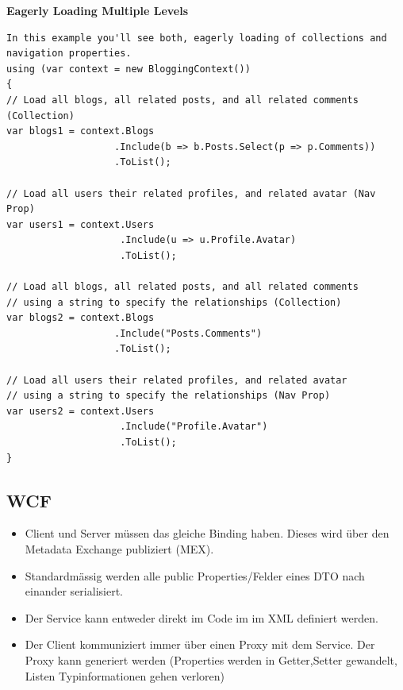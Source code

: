 \documentclass[
a4paper,
oneside,
10pt,
fleqn,
headsepline,
toc=listofnumbered, 
bibliography=totocnumbered]{scrartcl}
\begin{document}
\textbf{Eagerly Loading Multiple Levels}
\begin{lstlisting}
In this example you'll see both, eagerly loading of collections and navigation properties.
using (var context = new BloggingContext()) 
{ 
// Load all blogs, all related posts, and all related comments (Collection)
var blogs1 = context.Blogs 
                   .Include(b => b.Posts.Select(p => p.Comments)) 
                   .ToList(); 

// Load all users their related profiles, and related avatar (Nav Prop)
var users1 = context.Users 
                    .Include(u => u.Profile.Avatar) 
                    .ToList(); 

// Load all blogs, all related posts, and all related comments  
// using a string to specify the relationships (Collection)
var blogs2 = context.Blogs 
                   .Include("Posts.Comments") 
                   .ToList(); 

// Load all users their related profiles, and related avatar  
// using a string to specify the relationships (Nav Prop)
var users2 = context.Users 
                    .Include("Profile.Avatar") 
                    .ToList(); 
}
\end{lstlisting}

\clearpage

\subsection{WCF}
\begin{itemize}
	\item Client und Server müssen das gleiche Binding haben. Dieses wird über den Metadata Exchange publiziert (MEX).
	\item Standardmässig werden alle public Properties/Felder eines DTO nach einander serialisiert.
	\item Der Service kann entweder direkt im Code im im XML definiert werden.
	\item Der Client kommuniziert immer über einen Proxy mit dem Service. Der Proxy kann generiert werden (Properties werden in Getter,Setter gewandelt, Listen Typinformationen gehen verloren)
\end{itemize}
\end{document}
